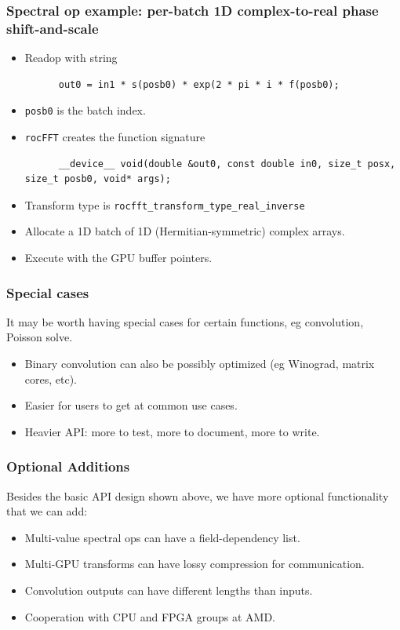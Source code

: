 \documentclass[10pt,aspectratio=169]{beamer}
\begin{document}
  
\begin{frame}[fragile]
  \frametitle{Spectral op example: per-batch 1D complex-to-real phase
    shift-and-scale}
  \begin{itemize}
  \item Readop with string
    \begin{lstlisting}
      out0 = in1 * s(posb0) * exp(2 * pi * i * f(posb0);
    \end{lstlisting}
  \item \lstinline{posb0} is the batch index.
  \item \texttt{rocFFT} creates the function signature
    \begin{lstlisting}
      __device__ void(double &out0, const double in0, size_t posx, size_t posb0, void* args);
    \end{lstlisting}
  \item Transform type is \texttt{rocfft_transform_type_real_inverse}
  \item Allocate a 1D batch of 1D (Hermitian-symmetric) complex arrays.
  \item Execute with the GPU buffer pointers.
  \end{itemize}
  
\end{frame}

\begin{frame}
  \frametitle{Special cases}

  It may be worth having special cases for certain functions, eg
  convolution, Poisson solve.

  \medskip

  \begin{itemize}
  \item Binary convolution can also be possibly optimized (eg
    Winograd, matrix cores, etc).
  \item Easier for users to get at common use cases.
  \item Heavier API: more to test, more to document, more to write.
  \end{itemize}
  
\end{frame}

\begin{frame}
  \frametitle{Optional Additions}

  Besides the basic API design shown above, we have more optional
  functionality that we can add:

  \medskip
  
  \begin{itemize}
  \item Multi-value spectral ops can have a field-dependency list.
  \item Multi-GPU transforms can have lossy compression for communication.
  \item Convolution outputs can have different lengths than inputs.
  \item Cooperation with CPU and FPGA groups at AMD.
  \end{itemize}
  
  
\end{frame}
\end{document}
